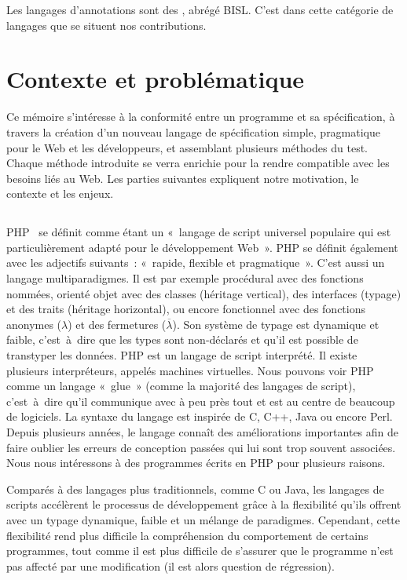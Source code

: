 Les langages d'annotations sont des , abrégé BISL. C'est dans cette catégorie de langages que
se situent nos contributions.

\section{Contexte et problématique}

Ce mémoire s'intéresse à la conformité entre un programme et sa spécification, à
travers la création d'un nouveau langage de spécification simple, pragmatique
pour le Web et les développeurs, et assemblant plusieurs méthodes du test.
Chaque méthode introduite se verra enrichie pour la rendre compatible avec les
besoins liés au Web. Les parties suivantes expliquent notre motivation, le
contexte et les enjeux.

\subsection{}

PHP~ se définit comme étant un «~langage de script universel
populaire qui est particulièrement adapté pour le développement Web~». PHP se
définit également avec les adjectifs suivants~: «~rapide, flexible et
pragmatique~». C'est aussi un langage multiparadigmes. Il est par exemple
procédural avec des fonctions nommées, orienté objet avec des classes (héritage
vertical), des interfaces (typage) et des traits (héritage horizontal), ou
encore fonctionnel avec des fonctions anonymes ($\lambda$) et des fermetures
($\overline{\lambda}$). Son système de typage est dynamique et faible,
c'est~à~dire que les types sont non-déclarés et qu'il est possible de transtyper
les données. PHP est un langage de script interprété. Il existe plusieurs
interpréteurs, appelés machines virtuelles. Nous pouvons voir PHP comme un
langage «~glue~» (comme la majorité des langages de script), c'est~à~dire qu'il
communique avec à peu près tout et est au centre de beaucoup de logiciels. La
syntaxe du langage est inspirée de C, C++, Java ou encore Perl.  Depuis
plusieurs années, le langage connaît des améliorations importantes afin de faire
oublier les erreurs de conception passées qui lui sont trop souvent associées.
Nous nous intéressons à des programmes écrits en PHP pour plusieurs raisons.

Comparés à des langages plus traditionnels, comme C ou Java, les langages de
scripts accélèrent le processus de développement grâce à la flexibilité qu'ils
offrent avec un typage dynamique, faible et un mélange de paradigmes. Cependant,
cette flexibilité rend plus difficile la compréhension du comportement de
certains programmes, tout comme il est plus difficile de s'assurer que le
programme n'est pas affecté par une modification (il est alors question de
régression).

